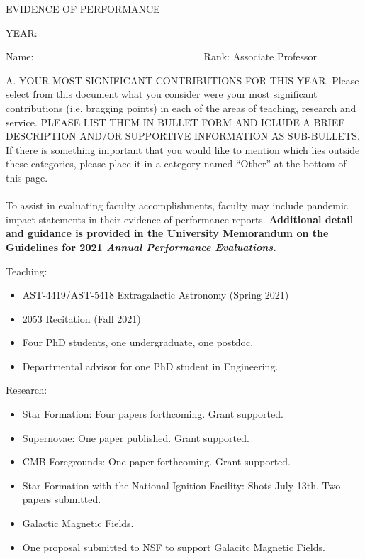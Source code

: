 \addtolength{\topmargin}{-.5in}
\addtolength{\textheight}{2.5cm}
\addtolength{\oddsidemargin}{-.75in}
\addtolength{\evensidemargin}{-.75in}
\addtolength{\textwidth}{.5in}


\centerline{EVIDENCE OF PERFORMANCE}
\bigskip
\centerline{YEAR: }
\bigskip
\noindent Name: 
\hbox{\ \ \ \ \ \ \ \
\ \ \ \ \ \ \ \ \ \ \ \ \ \ \ \ \ \ \ \ \ \ \ \ \ }
Rank: \underbar
{Associate Professor }

\vskip 20pt

\noindent A. YOUR MOST SIGNIFICANT CONTRIBUTIONS FOR THIS YEAR.
Please select from this document what you consider were your most
significant contributions (i.e. bragging points) in each of the areas of teaching, research
and service. PLEASE LIST THEM IN BULLET FORM AND ICLUDE A BRIEF 
DESCRIPTION AND/OR SUPPORTIVE INFORMATION AS SUB-BULLETS. 
If there is something important that you would like to mention which
lies outside these categories, please
place it in a category named ``Other'' at the bottom of this page. \\ \\

To assist in evaluating faculty accomplishments, faculty may include pandemic impact statements in their evidence of performance reports.  \textbf {Additional detail and guidance is provided in the University Memorandum on the Guidelines for 2021 \textit{Annual Performance Evaluations}.}


\vskip 10pt
\noindent
Teaching:
\begin{itemize}
	\item AST-4419/AST-5418 Extragalactic Astronomy (Spring 2021)
	\item 2053 Recitation (Fall 2021)
	\item Four PhD students, one undergraduate, one postdoc, 
    \item Departmental advisor for one PhD student in
        Engineering.
\end{itemize}
\vskip 30pt

\noindent
Research:
\begin{itemize}
	\item Star Formation: Four papers forthcoming.  Grant supported.
	\item Supernovae: One paper published.   Grant supported.
	\item CMB Foregrounds: One paper forthcoming.  Grant supported.
    \item Star Formation with the National Ignition Facility: Shots July 13th.
        Two papers submitted.  
    \item Galactic Magnetic Fields.  
    \item One proposal submitted to NSF to support Galacitc Magnetic Fields.
\end{itemize}
\vskip 30pt

